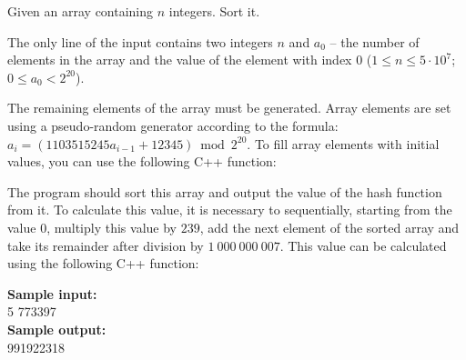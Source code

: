 \documentclass[a4paper]{article}
\begin{document}
Given an array containing $n$ integers. Sort it.

The only line of the input contains two integers $n$ and $a_0$ -- the number of elements in the array and the value of the element with index $0$ ($1 \le n \le 5 \cdot 10^7$; $0 \le a_0 < 2^{20}$).

The remaining elements of the array must be generated. Array elements are set using a pseudo-random generator according to the formula: $a_i=(1103515245 a_{i-1} + 12345) \bmod 2^{20}$. To fill array elements with initial values, you can use the following C++ function:



The program should sort this array and output the value of the hash function from it. To calculate this value, it is necessary to sequentially, starting from the value $0$, multiply this value by $239$, add the next element of the sorted array and take its remainder after division by $1 \ 000 \ 000 \ 007$. This value can be calculated using the following C++ function:



\LINE

\noindent \textbf{Sample input:}\\
5 773397\\


\noindent \textbf{Sample output:}\\
991922318\\
\end{document}
